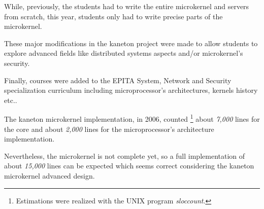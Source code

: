 While, previously, the students had to write the entire microkernel
and servers from scratch, this year, students only had to write precise
parts of the microkernel.

These major modifications in the kaneton project were made to
allow students to explore advanced fields like distributed systems
aspects and/or microkernel's security.

Finally, courses were added to the EPITA System, Network and Security
specialization curriculum including microprocessor's architectures,
kernels history etc..

The kaneton microkernel implementation, in 2006, counted
\footnote{Estimations were realized with the UNIX program \textit{sloccount}.}
about \textit{7,000} lines for the core and about \textit{2,000} lines for the
microprocessor's architecture implementation.

Nevertheless, the microkernel is not complete yet, so a full implementation
of about \textit{15,000} lines can be expected which seems correct
considering the kaneton microkernel advanced design.
